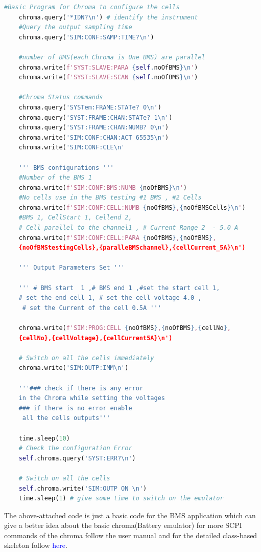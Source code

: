 \begin{lstlisting}[language=Python, caption=Basic BMS Program for Chroma]
    #Basic Program for Chroma to configure the cells
    chroma.query('*IDN?\n') # identify the instrument
    #Query the output sampling time
    chroma.query('SIM:CONF:SAMP:TIME?\n') 

    #number of BMS(each Chroma is One BMS) are parallel
    chroma.write(f'SYST:SLAVE:PARA {self.noOfBMS}\n')
    chroma.write(f'SYST:SLAVE:SCAN {self.noOfBMS}\n')

    #Chroma Status commands
    chroma.query('SYSTem:FRAME:STATe? 0\n')
    chroma.query('SYST:FRAME:CHAN:STATe? 1\n')
    chroma.query('SYST:FRAME:CHAN:NUMB? 0\n')
    chroma.write('SIM:CONF:CHAN:ACT 65535\n')
    chroma.write('SIM:CONF:CLE\n'

    ''' BMS configurations '''
    #Number of the BMS 1
    chroma.write(f'SIM:CONF:BMS:NUMB {noOfBMS}\n')
    #No cells use in the BMS testing #1 BMS , #2 Cells 
    chroma.write(f'SIM:CONF:CELL:NUMB {noOfBMS},{noOfBMSCells}\n')
    #BMS 1, CellStart 1, Cellend 2, 
    # Cell parallel to the channel1 , # Current Range 2  - 5.0 A
    chroma.write(f'SIM:CONF:CELL:PARA {noOfBMS},{noOfBMS},
    {noOfBMStestingCells},{paralleBMSchannel},{cellCurrent_5A}\n') 

    ''' Output Parameters Set '''

    ''' # BMS start  1 ,# BMS end 1 ,#set the start cell 1, 
    # set the end cell 1, # set the cell voltage 4.0 ,
     # set the Current of the cell 0.5A '''

    chroma.write(f'SIM:PROG:CELL {noOfBMS},{noOfBMS},{cellNo},
    {cellNo},{cellVoltage},{cellCurrent5A}\n') 

    # Switch on all the cells immediately
    chroma.write('SIM:OUTP:IMM\n') 

    '''### check if there is any error 
    in the Chroma while setting the voltages 
    ### if there is no error enable
     all the cells outputs''' 

    time.sleep(10)
    # Check the configuration Error 
    self.chroma.query('SYST:ERR?\n')

    # Switch on all the cells
    self.chroma.write('SIM:OUTP ON \n')  
    time.sleep(1) # give some time to switch on the emulator 

\end{lstlisting}

The above-attached code is just a basic code for the BMS application which can give a better idea about the basic chroma(Battery emulator) for more SCPI commands of the chroma follow the user manual\cite{Chroma_UserManual} and for the detailed class-based skeleton follow \textcolor{blue}{here}. %

